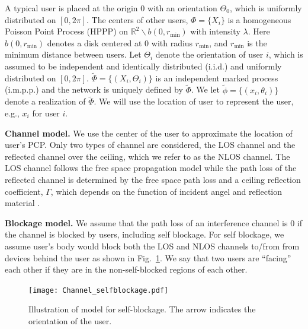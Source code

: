 \documentclass[10pt, conference, letterpaper]{IEEEtran}
\begin{document}
A typical user is placed at the origin 0 with an orientation $\Theta_0$, which is uniformly distributed on $[0, 2\pi]$. The centers of other users, $\Phi=\{X_i\}$ is a homogeneous Poisson Point Process (HPPP) on $\mathbb{R}^2\backslash {b}(0, r_{\min})$ with intensity $\lambda$. 
Here $b(0, r_{\min})$ denotes a disk centered at $0$ with radius $r_{\min}$, and $r_{\min}$ is the minimum distance between users.  
Let $\Theta_i$ denote the orientation of user $i$, which is assumed to be independent and identically distributed (i.i.d.) and uniformly distributed on $[0, 2\pi]$.
$\tilde{\Phi} = \{(X_i, \Theta_i)\}$ is an independent marked process (i.m.p.p.) and the network is uniquely defined by $\tilde{\Phi}$.
We let $\tilde{\phi} = \{(x_i, \theta_i)\}$ denote a realization of $\tilde{\Phi}$. 
We will use the location of user to represent the user, e.g., $x_i$ for user $i$. 


\textbf{Channel model.} We use the center of the user to approximate the location of user's PCP.
Only two types of channel are considered, the LOS channel and the reflected channel over the ceiling, which we refer to as the NLOS channel.
The LOS channel follows the free space propagation model while the path loss of the reflected channel is determined by the free space path loss and a ceiling reflection coefficient, $\Gamma$, which depends on the function of incident angel and reflection material \cite{reflection}.


\textbf{Blockage model.} We assume that the path loss of an interference channel is 0 if the channel is blocked by users, including self blockage.
For self blockage, we assume user's body would block both the LOS and NLOS channels to/from from devices behind the user as shown in Fig.~\ref{fig:channel:self-blockage}. 
We say that two users are ``facing'' each other if they are in the non-self-blocked regions of each other.


\begin{figure}
	\centering
	\texttt{[image: Channel\_selfblockage.pdf]}
	\caption{Illustration of model for self-blockage. The arrow indicates the orientation of the user.}
	\label{fig:channel:self-blockage}
\end{figure}
\end{document}

